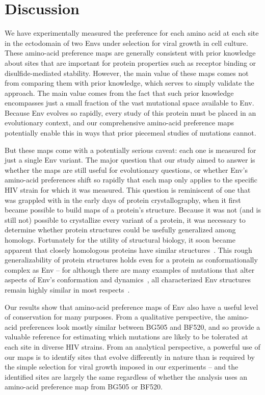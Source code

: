 \documentclass[9pt]{elife}
\begin{document}
\section{Discussion}
We have experimentally measured the preference for each amino acid at each site in the ectodomain of two Envs under selection for viral growth in cell culture.
These amino-acid preference maps are generally consistent with prior knowledge about sites that are important for protein properties such as receptor binding or disulfide-mediated stability.
However, the main value of these maps comes not from comparing them with prior knowledge, which serves to simply validate the approach.
The main value comes from the fact that such prior knowledge encompasses just a small fraction of the vast mutational space available to Env.
Because Env evolves so rapidly, every study of this protein must be placed in an evolutionary context, and our comprehensive amino-acid preference maps potentially enable this in ways that prior piecemeal studies of mutations cannot.

But these maps come with a potentially serious caveat: each one is measured for just a single Env variant.
The major question that our study aimed to answer is whether the maps are still useful for evolutionary questions, or whether Env's amino-acid preferences shift so rapidly that each map only applies to the specific HIV strain for which it was measured.
This question is reminiscent of one that was grappled with in the early days of protein crystallography, when it first became possible to build maps of a protein's structure.
Because it was not (and is still not) possible to crystallize every variant of a protein, it was necessary to determine whether protein structures could be usefully generalized among homologs.
Fortunately for the utility of structural biology, it soon became apparent that closely homologous proteins have similar structures~\citep{chothia1986relation,sander1991database}.
This rough generalizability of protein structures holds even for a protein as conformationally complex as Env -- for although there are many examples of mutations that alter aspects of Env's conformation and dynamics~\citep{kwong2000structures,white2010molecular,almond2010structural,davenport2013isolate}, all characterized Env structures remain highly similar in most respects~\citep{julien2015design,pugach2015native,stewart2016trimeric,verkerke2016epitope,gristick2017x}.

Our results show that amino-acid preference maps of Env also have a useful level of conservation for many purposes.
From a qualitative perspective, the amino-acid preferences look mostly similar between BG505 and BF520, and so provide a valuable reference for estimating which mutations are likely to be tolerated at each site in diverse HIV strains.
From an analytical perspective, a powerful use of our maps is to identify sites that evolve differently in nature than is required by the simple selection for viral growth imposed in our experiments -- and the identified sites are largely the same regardless of whether the analysis uses an amino-acid preference map from BG505 or BF520.
\end{document}

